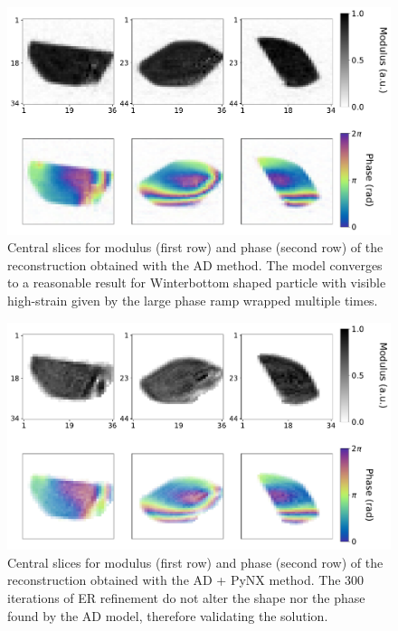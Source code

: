 \begin{figure}[H]
  \centering
  \includegraphics[width=\textwidth]{figures/AD/ad_michael.pdf}
  \caption{Central slices for modulus (first row) and phase (second row) of the reconstruction obtained with the AD method.
  The model converges to a reasonable result for Winterbottom shaped particle with visible high-strain given by the large phase ramp wrapped 
  multiple times.}

  \label{fig:ad_michael}
\end{figure}

\begin{figure}[H]
  \centering
  \includegraphics[width=\textwidth]{figures/AD/ad_pynx_michael.pdf}
  \caption{Central slices for modulus (first row) and phase (second row) of the reconstruction obtained with the AD + PyNX method.
  The 300 iterations of ER refinement do not alter the shape nor the phase found by the AD model, therefore validating the solution.}
  \label{fig:adpynx_michael}
\end{figure}

